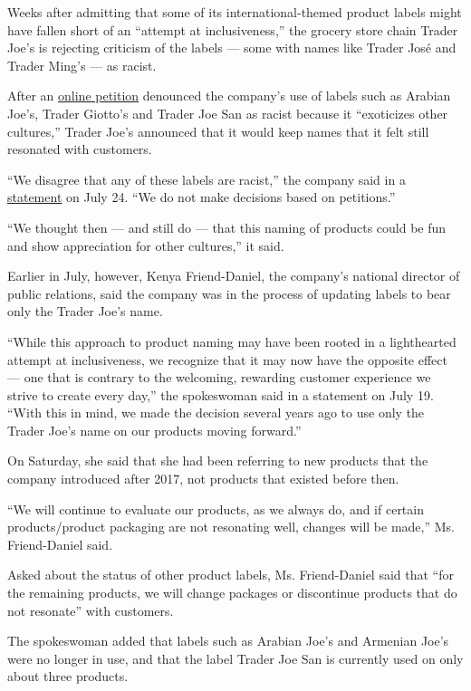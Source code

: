 Weeks after admitting that some of its international-themed product
labels might have fallen short of an ``attempt at inclusiveness,'' the
grocery store chain Trader Joe's is rejecting criticism of the labels
--- some with names like Trader José and Trader Ming's --- as racist.

After an
\href{https://www.nytimes3xbfgragh.onion/2020/07/19/business/trader-joes-petition.html}{online
petition} denounced the company's use of labels such as Arabian Joe's,
Trader Giotto's and Trader Joe San as racist because it ``exoticizes
other cultures,'' Trader Joe's announced that it would keep names that
it felt still resonated with customers.

``We disagree that any of these labels are racist,'' the company said in
a
\href{https://www.traderjoes.com/announcement/a-note-about-our-product-naming}{statement}
on July 24. ``We do not make decisions based on petitions.''

``We thought then --- and still do --- that this naming of products
could be fun and show appreciation for other cultures,'' it said.

Earlier in July, however, Kenya Friend-Daniel, the company's national
director of public relations, said the company was in the process of
updating labels to bear only the Trader Joe's name.

``While this approach to product naming may have been rooted in a
lighthearted attempt at inclusiveness, we recognize that it may now have
the opposite effect --- one that is contrary to the welcoming, rewarding
customer experience we strive to create every day,'' the spokeswoman
said in a statement on July 19. ``With this in mind, we made the
decision several years ago to use only the Trader Joe's name on our
products moving forward.''

On Saturday, she said that she had been referring to new products that
the company introduced after 2017, not products that existed before
then.

``We will continue to evaluate our products, as we always do, and if
certain products/product packaging are not resonating well, changes will
be made,'' Ms. Friend-Daniel said.

Asked about the status of other product labels, Ms. Friend-Daniel said
that ``for the remaining products, we will change packages or
discontinue products that do not resonate'' with customers.

The spokeswoman added that labels such as Arabian Joe's and Armenian
Joe's were no longer in use, and that the label Trader Joe San is
currently used on only about three products.


